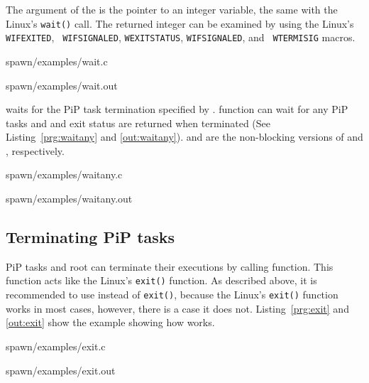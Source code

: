 The argument of the  is the pointer to an integer
variable, the same with the Linux's {\tt wait()} call. The returned
integer can be examined by using the Linux's {\tt WIFEXITED}, {\tt
  WIFSIGNALED}, {\tt WEXITSTATUS}, {\tt WIFSIGNALED}, and {\tt
  WTERMISIG} macros.


                {spawn/examples/wait.c}

 {spawn/examples/wait.out}

 waits for the PiP task termination specified by
        {\PIPID}. 
 function can wait for any PiP tasks and
        {\PIPID} and exit status are returned when terminated (See
        Listing~\ref{prg:waitany} and \ref{out:waitany}).
         and  are
        the non-blocking versions of  and
        , respectively. 


                {spawn/examples/waitany.c}

 {spawn/examples/waitany.out}


\subsection{Terminating PiP tasks}

PiP tasks and root can terminate their executions by calling
 function. This function acts like the Linux's
        {\tt exit()} function. As described above, it is recommended
        to use  
        instead of {\tt exit()}, because the Linux's {\tt exit()}
        function works in most cases, however, there is a case it does
        not. Listing~\ref{prg:exit} and \ref{out:exit} show the
        example showing how  works.

 {spawn/examples/exit.c}

 {spawn/examples/exit.out}
